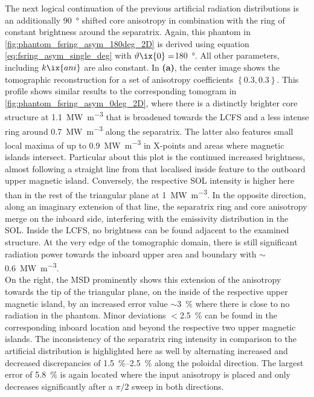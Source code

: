                 The next logical continuation of the previous artificial radiation distributions is an additionally \SI{90}{\degree} shifted core anisotropy in combination with the ring of constant brightness around the separatrix. Again, this phantom in \cref{fig:phantom_fsring_asym_180deg_2D} is derived using equation \ref{eq:fsring_asym_single_deg} with $\vartheta\ix{0}=$\SI{180}{\degree}. All other parameters, including $k\ix{ani}$ are also constant. In \textbf{(a)}, the center image shows the tomographic reconstruction for a set of anisotropy coefficients $\left\{0.3, 0.3\right\}$. This profile shows similar results to the corresponding tomogram in \cref{fig:phantom_fsring_asym_0deg_2D}, where there is a distinctly brighter core structure at \SI{1.1}{\mega\watt\per\cubic\meter} that is broadened towards the LCFS and a less intense ring around \SI{0.7}{\mega\watt\per\cubic\meter} along the separatrix. The latter also features small local maxima of up to \SI{0.9}{\mega\watt\per\cubic\meter} in X-points and areas where magnetic islands intersect. Particular about this plot is the continued increased brightness, almost following a straight line from that localised inside feature to the outboard upper magnetic island. Conversely, the respective SOL intensity is higher here than in the rest of the triangular plane at \SI{1}{\mega\watt\per\cubic\meter}. In the opposite direction, along an imaginary extension of that line, the separatrix ring and core anisotropy merge on the inboard side, interfering with the emissivity distribution in the SOL. Inside the LCFS, no brightness can be found adjacent to the examined structure. At the very edge of the tomographic domain, there is still significant radiation power towards the inboard upper area and boundary with $\sim$\SI{0.6}{\mega\watt\per\cubic\meter}.\\%
                On the right, the MSD prominently shows this extension of the anisotropy towards the tip of the triangular plane, on the inside of the respective upper magnetic island, by an increased error value $\sim$\SI{3}{\percent} where there is close to no radiation in the phantom. Minor deviations $<$\SI{2.5}{\percent} can be found in the corresponding inboard location and beyond the respective two upper magnetic islands. The inconsistency of the separatrix ring intensity in comparison to the artificial distribution is highlighted here as well by alternating increased and decreased discrepancies of \SIrange{1.5}{2.5}{\percent} along the poloidal direction. The largest error of \SI{5.8}{\percent} is again located where the input anisotropy is placed and only decreases significantly after a $\pi/2$ sweep in both directions.\\%
